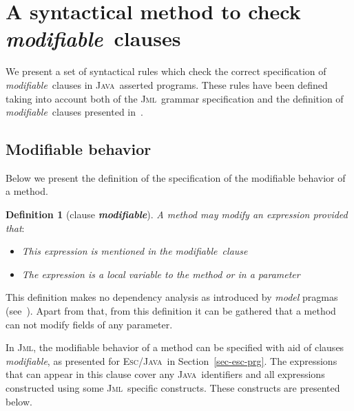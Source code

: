 \documentclass[a4paper]{llncs}
\newcommand{\jml}{\textsc{Jml}}
\newcommand{\escj}{\textsc{Esc/Java}}
\newcommand{\java}{\textsc{Java}}
\newcommand{\modif}{\textit{modifiable}}
\newtheorem {df}{Definition}
\begin{document}
\section{A syntactical method to check \modif~clauses}
\label{sec-giv-sin-def}
We present a set of syntactical rules which check the correct
specification of \modif~clauses in \java~asserted programs. These
rules have been defined taking into account both of the \jml~grammar
specification and the definition of \modif~clauses presented
in~\cite{LBR00}.




\subsection{Modifiable behavior}
Below we present the definition of the specification of the modifiable
behavior of a method.
\begin{df}[clause {\bf \it modifiable}]
\label{def-mod}
A method may modify an expression provided that$:$ 
\begin{itemize}
\item This expression is mentioned in the \modif~clause
\item The expression is a local variable to the method or in a
parameter
\end{itemize}
\end{df}
This definition makes no dependency analysis as introduced by
\emph{model} pragmas (see~\cite{LBR00}). Apart from that, from this
definition it can be
gathered that a method can not modify fields of any parameter.

In \jml, the modifiable behavior of a method can be specified with
aid of clauses \modif, as presented for \escj~in
Section~\ref{sec-esc-prg}. The expressions that can appear in this
clause cover any
\java~identifiers and all expressions constructed using some
\jml~specific constructs. These constructs are presented below.
\end{document}
